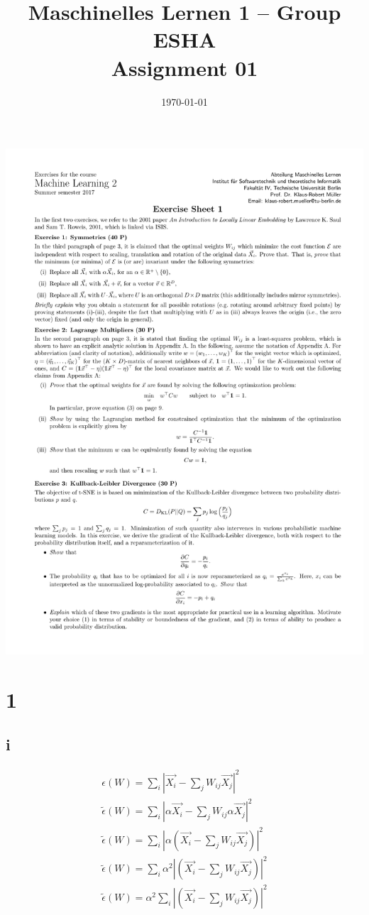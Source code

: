 \documentclass[11pt,a4paper]{article}
\title{Maschinelles Lernen 1 -- Group ESHA \\
        Assignment 01
}
\author{\students}
\date{\today}
\begin{document}
\maketitle

\includegraphics[clip, trim=0.5cm 0.5cm 0.5cm 5cm, width=1.00\textwidth]{sheet01.pdf}

\section*{1}

\subsection*{i}

\begin{gather*}
\epsilon(W) = \sum_{i} |\vec{X_{i}} - \sum_j W_{ij} \vec{X_{j}}| ^{2} \\
\tilde{\epsilon}(W) = \sum_{i} |\alpha \vec{X_{i}} - \sum_j W_{ij} \alpha \vec{X_{j}}| ^{2} \\
\tilde{\epsilon}(W) = \sum_{i} |\alpha (\vec{X_{i}} - \sum_j W_{ij} \vec{X_{j}})| ^{2} \\
\tilde{\epsilon}(W) = \sum_{i} \alpha^2 |(\vec{X_{i}} - \sum_j W_{ij} \vec{X_{j}})| ^{2} \\
\tilde{\epsilon}(W) = \alpha^2 \sum_{i} |(\vec{X_{i}} - \sum_j W_{ij} \vec{X_{j}})| ^{2} \\
\end{gather*}
\end{document}
